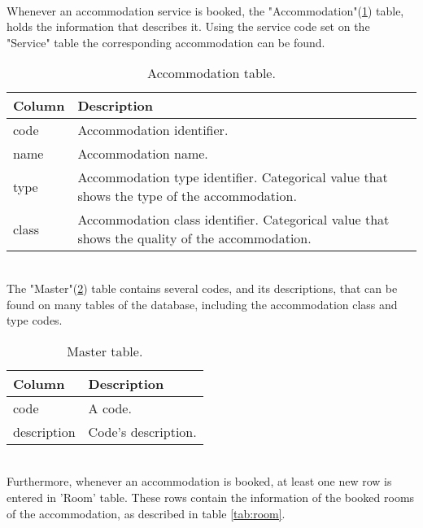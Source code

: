 \\
Whenever an accommodation service is booked, the "Accommodation"(\ref{tab:accommodation}) table, holds the information that describes it. Using the service code set on the "Service" table the corresponding accommodation can be found. \\
\begin{table}[h!]
\begin{center}
\begin{tabular}{l | p{12cm}}
\textcolor{theme}{\textbf{Column}} & \textcolor{theme}{\textbf{Description}}\\
\hline
code & Accommodation identifier.\\
\hline
name & Accommodation name.\\
\hline
type & Accommodation type identifier. Categorical value that shows the type of the accommodation. \\
\hline
class & Accommodation class identifier. Categorical value that shows the quality of the accommodation. \\
\hline
\end{tabular}
\caption{Accommodation table.}
\label{tab:accommodation}
\end{center}
\end{table}
\\
The "Master"(\ref{tab:master}) table contains several codes, and its descriptions, that can be found on many tables of the database, including the accommodation class and type codes. \\
\begin{table}[h!]
\begin{center}
\begin{tabular}{l | p{12cm}}
\textcolor{theme}{\textbf{Column}} & \textcolor{theme}{\textbf{Description}}\\
\hline
code & A code.\\
\hline
description & Code's description.\\
\hline
\end{tabular}
\caption{Master table.}
\label{tab:master}
\end{center}
\end{table}
\\
Furthermore, whenever an accommodation is booked, at least one new row is entered in 'Room' table. These rows contain the information of the booked rooms of the accommodation, as described in table \ref{tab:room}. \\
